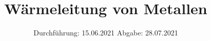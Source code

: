 

\subject{V204}
\title{Wärmeleitung von Metallen}
\date{%
  Durchführung: 15.06.2021
  \hspace{3em}
  Abgabe: 28.07.2021
}



\maketitle
\thispagestyle{empty}
\tableofcontents
\newpage








\printbibliography{}


